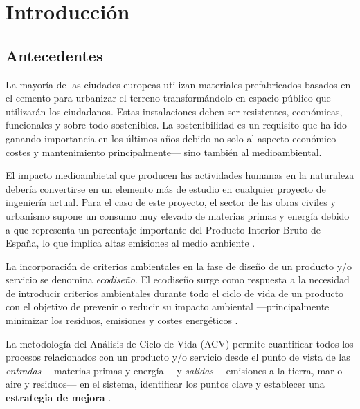 \chapter{Introducción}
\section{Antecedentes}

La mayoría de las ciudades europeas utilizan materiales prefabricados basados en el cemento para urbanizar el terreno transformándolo en espacio público que utilizarán los ciudadanos. Estas instalaciones deben ser resistentes, económicas, funcionales y sobre todo sostenibles. La sostenibilidad es un requisito que ha ido ganando importancia en los últimos años debido no solo al aspecto económico —costes y mantenimiento principalmente— sino también al medioambiental.

El impacto medioambietal que producen las actividades humanas en la naturaleza debería convertirse en un elemento más de estudio en cualquier proyecto de ingeniería actual. Para el caso de este proyecto, el sector de las obras civiles y urbanismo supone un consumo muy elevado de materias primas y energía debido a que representa un porcentaje importante del Producto Interior Bruto de España, lo que implica altas emisiones al medio ambiente \cite{minetur}.

La incorporación de criterios ambientales en la fase de diseño de un producto y/o servicio se denomina \textit{ecodiseño}. El ecodiseño surge como respuesta a la necesidad de introducir criterios ambientales durante todo el ciclo de vida de un producto con el objetivo de prevenir o reducir su impacto ambiental —principalmente minimizar los residuos, emisiones y costes energéticos \cite{iso14006}.

La metodología del Análisis de Ciclo de Vida (ACV) permite cuantificar todos los procesos relacionados con un producto y/o servicio desde el punto de vista de las \textit{entradas} —materias primas y energía— y \textit{salidas} —emisiones a la tierra, mar o aire y residuos— en el sistema, identificar los puntos clave y establecer una \textbf{estrategia de mejora} \cite{iso14040}.

